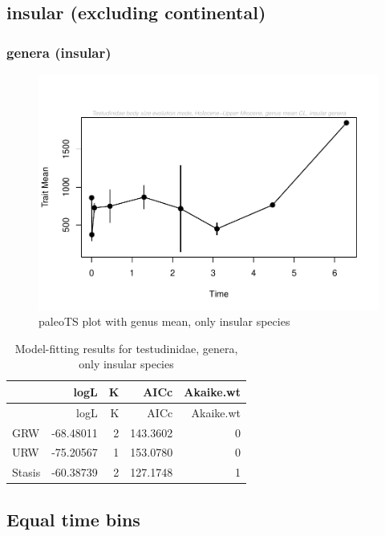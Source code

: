 \documentclass[]{article}
\begin{document}
\newpage

\subsection{insular (excluding
continental)}\label{insular-excluding-continental}

\subsubsection{genera (insular)}\label{genera-insular}

\begin{figure}[htbp]
\centering
\includegraphics{MA_JJ_files/figure-latex/paleoTS plot with genus mean, excluding continental species-1.pdf}
\caption{paleoTS plot with genus mean, only insular species}
\end{figure}

\begin{longtable}[]{@{}lrrrr@{}}
\caption{Model-fitting results for testudinidae, genera, only insular
species}\tabularnewline
\toprule
& logL & K & AICc & Akaike.wt\tabularnewline
\midrule
\endfirsthead
\toprule
& logL & K & AICc & Akaike.wt\tabularnewline
\midrule
\endhead
GRW & -68.48011 & 2 & 143.3602 & 0\tabularnewline
URW & -75.20567 & 1 & 153.0780 & 0\tabularnewline
Stasis & -60.38739 & 2 & 127.1748 & 1\tabularnewline
\bottomrule
\end{longtable}

\newpage

\subsection{Equal time bins}\label{equal-time-bins}
\end{document}
